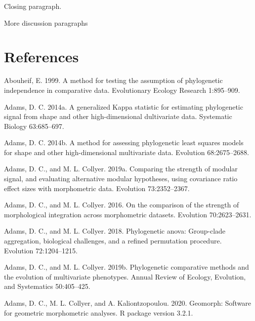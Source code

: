 \documentclass[
]{article}
\begin{document}
Closing paragraph.

\hfill\break

More discussion paragraphs

\newpage

\hypertarget{references}{%
\section{References}\label{references}}

\setlength{\parindent}{-0.25in} \setlength{\leftskip}{0.25in}
\setlength{\parskip}{8pt} \noindent

\hypertarget{refs}{}
\leavevmode\hypertarget{ref-Abouheif1999}{}%
Abouheif, E. 1999. A method for testing the assumption of phylogenetic
independence in comparative data. Evolutionary Ecology Research
1:895--909.

\leavevmode\hypertarget{ref-Adams2014a}{}%
Adams, D. C. 2014a. A generalized Kappa statistic for estimating
phylogenetic signal from shape and other high-dimensional dultivariate
data. Systematic Biology 63:685--697.

\leavevmode\hypertarget{ref-Adams2014b}{}%
Adams, D. C. 2014b. A method for assessing phylogenetic least squares
models for shape and other high-dimensional multivariate data. Evolution
68:2675--2688.

\leavevmode\hypertarget{ref-AdamsCollyer2019b}{}%
Adams, D. C., and M. L. Collyer. 2019a. Comparing the strength of
modular signal, and evaluating alternative modular hypotheses, using
covariance ratio effect sizes with morphometric data. Evolution
73:2352--2367.

\leavevmode\hypertarget{ref-AdamsCollyer2016}{}%
Adams, D. C., and M. L. Collyer. 2016. On the comparison of the strength
of morphological integration across morphometric datasets. Evolution
70:2623--2631.

\leavevmode\hypertarget{ref-AdamsCollyer2018b}{}%
Adams, D. C., and M. L. Collyer. 2018. Phylogenetic anova: Group-clade
aggregation, biological challenges, and a refined permutation procedure.
Evolution 72:1204--1215.

\leavevmode\hypertarget{ref-AdamsCollyer2019}{}%
Adams, D. C., and M. L. Collyer. 2019b. Phylogenetic comparative methods
and the evolution of multivariate phenotypes. Annual Review of Ecology,
Evolution, and Systematics 50:405--425.

\leavevmode\hypertarget{ref-AdamsGeomorph}{}%
Adams, D. C., M. L. Collyer, and A. Kaliontzopoulou. 2020. Geomorph:
Software for geometric morphometric analyses. R package version 3.2.1.
\end{document}
